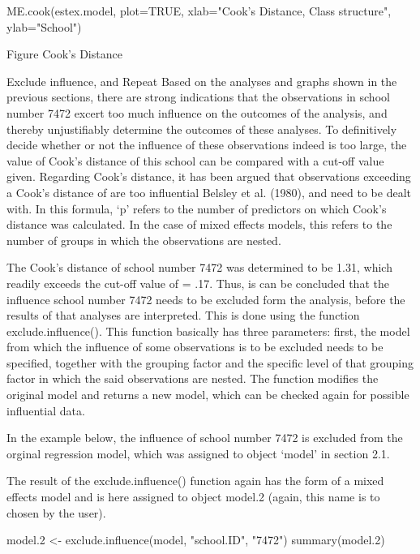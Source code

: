ME.cook(estex.model, plot=TRUE,
xlab="Cook's Distance, Class structure",
ylab="School")

Figure Cook's Distance

Exclude influence, and Repeat
Based on the analyses and graphs shown in the previous sections, there are strong indications that the observations in school number 7472 excert too much influence on the outcomes of the analysis, and thereby unjustifiably determine the outcomes of these analyses. To definitively decide whether or not the influence of these observations indeed is too large, the value of Cook’s distance of this school can be compared with a cut-off value given. Regarding Cook’s distance, it has been argued that observations exceeding a Cook’s distance of are too influential Belsley et al. (1980), and need to be dealt with. In this formula, ‘p’ refers to the number of predictors on which Cook’s distance was calculated. In the case of mixed effects models, this refers to the number of groups in which the observations are nested.

The Cook’s distance of school number 7472 was determined to be 1.31, which readily exceeds the cut-off value of = .17. Thus, is can be concluded that the influence school number 7472 needs to be excluded form the analysis, before the results of that analyses are interpreted. This is done using the function exclude.influence(). This function basically has three parameters: first, the model from which the influence of some observations is to be excluded needs to be specified, together with the grouping factor and the specific level of that grouping factor in which the said observations are nested. The function modifies the original model and returns a new model, which can be checked again for possible influential data.

In the example below, the influence of school number 7472 is excluded from the orginal regression model, which was assigned to object ‘model’ in section 2.1.

The result of the exclude.influence() function again has the form of a mixed effects model and is here assigned to object model.2 (again, this name is to chosen by the user).

model.2 <- exclude.influence(model, "school.ID", "7472")
summary(model.2)


